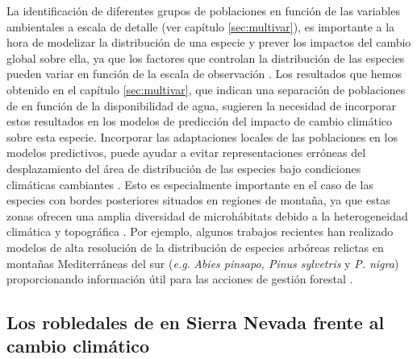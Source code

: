 La identificación de diferentes grupos de poblaciones en función de las variables ambientales a escala de detalle (ver capítulo \ref{sec:multivar}), es importante a la hora de modelizar la distribución de una especie y prever los impactos del cambio global sobre ella, ya que los factores que controlan la distribución de las especies pueden variar en función de la escala de observación \autocites{GuisanThuiller2005PredictingSpecies,Urbietaetal2008SoilWater,SanchezdeDiosetal2009PresentFuture}. Los resultados que hemos obtenido en el capítulo \ref{sec:multivar}, que indican una separación de poblaciones de \Qp en función de la disponibilidad de agua, sugieren la necesidad de incorporar estos resultados en los modelos de predicción del impacto de cambio climático sobre esta especie.  Incorporar las adaptaciones locales de las poblaciones en los modelos predictivos, puede ayudar a evitar representaciones erróneas del desplazamiento del área de distribución de las especies bajo condiciones climáticas cambiantes \autocite{BenitoGarzonetal2011IntraspecificVariability}. Esto es especialmente importante en el caso de las especies con bordes posteriores situados en regiones de montaña, ya que estas zonas ofrecen una amplia diversidad de microhábitats debido a la heterogeneidad climática y topográfica \autocite{MedailDiadema2009GlacialRefugia}.
Por ejemplo, algunos trabajos recientes han realizado modelos de alta resolución de la distribución de especies arbóreas relictas en montañas Mediterráneas del sur (\emph{e.g}. \emph{Abies pinsapo, Pinus sylvetris} y \emph{P. nigra}) proporcionando información útil para las acciones de gestión forestal \autocite{LopezTiradoHidalgo2014HighResolution}.

\subsection*{Los robledales de \Qp en Sierra Nevada frente al cambio climático
}\label{sec:discussions:climate}

